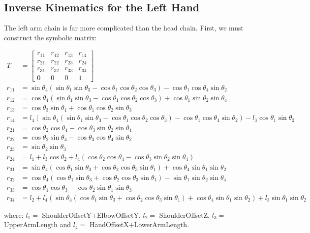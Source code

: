 \subsection{Inverse Kinematics for the Left Hand}
The left arm chain is far more complicated than the head chain. First, we must construct the symbolic matrix:
\begin{small}
\begin{align*}
T &= \begin{bmatrix}
r_{11} & r_{12} & r_{13} & r_{14}\\
r_{21} & r_{22} & r_{23} & r_{24}\\
r_{31} & r_{32} & r_{33} & r_{34}\\
0 & 0 & 0 & 1
\end{bmatrix}\\
r_{11} &= \sin\theta_4\left(\sin\theta_1\sin\theta_3 - \cos\theta_1\cos\theta_2\cos\theta_3\right) - \cos\theta_1\cos\theta_4\sin\theta_2\\
r_{12} &= \cos\theta_4\left(\sin\theta_1\sin\theta_3 - \cos\theta_1\cos\theta_2\cos\theta_3\right) + \cos\theta_1\sin\theta_2\sin\theta_4\\
r_{13} &= \cos\theta_3\sin\theta_1 + \cos\theta_1\cos\theta_2\sin\theta_3\\
r_{14} &= l_4\left(\sin\theta_4\left(\sin\theta_1\sin\theta_3 - \cos\theta_1\cos\theta_2\cos\theta_3\right) - \cos\theta_1\cos\theta_4\sin\theta_2\right) - l_3\cos\theta_1\sin\theta_2\\
r_{21} &= \cos\theta_2\cos\theta_4 - \cos\theta_3\sin\theta_2\sin\theta_4\\
r_{22} &= \cos\theta_2\sin\theta_4 - \cos\theta_3\cos\theta_4\sin\theta_2\\
r_{23} &= \sin\theta_2\sin\theta_3\\
r_{24} &= l_1 + l_3\cos\theta_2 + l_4\left(\cos\theta_2\cos\theta_4 - \cos\theta_3\sin\theta_2\sin\theta_4\right)\\
r_{31} &= \sin\theta_4\left(\cos\theta_1\sin\theta_3 + \cos\theta_2\cos\theta_3\sin\theta_1\right) + \cos\theta_4\sin\theta_1\sin\theta_2\\
r_{32} &= \cos\theta_4\left(\cos\theta_1\sin\theta_3 + \cos\theta_2\cos\theta_3\sin\theta_1\right) - \sin\theta_1\sin\theta_2\sin\theta_4\\
r_{33} &= \cos\theta_1\cos\theta_3 - \cos\theta_2\sin\theta_1\sin\theta_3\\
r_{34} &= l_2 + l_4\left(\sin\theta_4\left(\cos\theta_1\sin\theta_3 + \cos\theta_2\cos\theta_3\sin\theta_1\right) + \cos\theta_4\sin\theta_1\sin\theta_2\right) + l_3\sin\theta_1\sin\theta_2
\end{align*}
\end{small}
where: $l_1 =$ ShoulderOffsetY$+$ElbowOffsetY, $l_2 =$ ShoulderOffsetZ, $l_3 =$ UpperArmLength and $l_4 =$ HandOffsetX$+$LowerArmLength.

